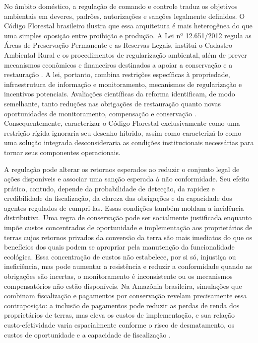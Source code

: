 No âmbito doméstico, a regulação de comando e controle traduz os objetivos ambientais em deveres, padrões, autorizações e sanções legalmente definidos. O Código Florestal brasileiro ilustra que essa arquitetura é mais heterogênea do que uma simples oposição entre proibição e produção. A Lei nº 12.651/2012 regula as Áreas de Preservação Permanente e as Reservas Legais, institui o Cadastro Ambiental Rural e os procedimentos de regularização ambiental, além de prever mecanismos econômicos e financeiros destinados a apoiar a conservação e a restauração \cite{brasil2012florestal}. A lei, portanto, combina restrições específicas à propriedade, infraestrutura de informação e monitoramento, mecanismos de regularização e incentivos potenciais. Avaliações científicas da reforma identificam, de modo semelhante, tanto reduções nas obrigações de restauração quanto novas oportunidades de monitoramento, compensação e conservação \cite{soaresfilho2014cracking,azevedo2017limits}. Consequentemente, caracterizar o Código Florestal exclusivamente como uma restrição rígida ignoraria seu desenho híbrido, assim como caracterizá-lo como uma solução integrada desconsideraria as condições institucionais necessárias para tornar seus componentes operacionais.

A regulação pode alterar os retornos esperados ao reduzir o conjunto legal de ações disponíveis e associar uma sanção esperada à não conformidade. Seu efeito prático, contudo, depende da probabilidade de detecção, da rapidez e credibilidade da fiscalização, da clareza das obrigações e da capacidade dos agentes regulados de cumpri-las. Essas condições também moldam a incidência distributiva. Uma regra de conservação pode ser socialmente justificada enquanto impõe custos concentrados de oportunidade e implementação aos proprietários de terras cujos retornos privados da conversão da terra são mais imediatos do que os benefícios dos quais podem se apropriar pela manutenção da funcionalidade ecológica. Essa concentração de custos não estabelece, por si só, injustiça ou ineficiência, mas pode aumentar a resistência e reduzir a conformidade quando as obrigações são incertas, o monitoramento é inconsistente ou os mecanismos compensatórios não estão disponíveis. Na Amazônia brasileira, simulações que combinam fiscalização e pagamentos por conservação revelam precisamente essa contraposição: a inclusão de pagamentos pode reduzir as perdas de renda dos proprietários de terras, mas eleva os custos de implementação, e sua relação custo-efetividade varia espacialmente conforme o risco de desmatamento, os custos de oportunidade e a capacidade de fiscalização \cite{borner2015mixing}.

